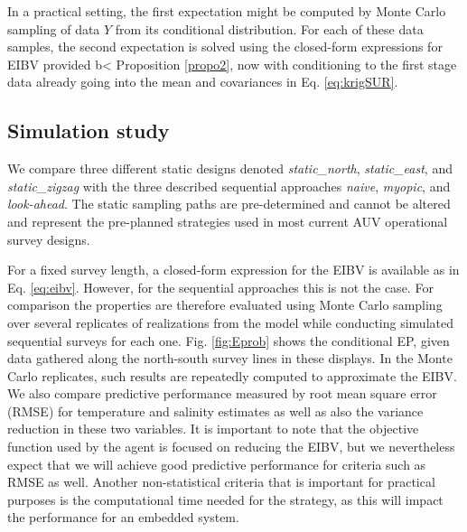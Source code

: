 \begin{remark}
In a practical setting, the first expectation might be computed by Monte
Carlo sampling of data $Y$ from its conditional
distribution. For each of these data samples, the second expectation
is solved using the closed-form expressions for EIBV provided b< Proposition \ref{propo2}, now with conditioning to the first stage data already going into the mean and covariances in Eq. \eqref{eq:krigSUR}. 
\end{remark}

\subsection{Simulation study}
\label{sec:simulations}

\label{sec:sampling_designs}


We compare three different static designs denoted
\textit{static\_north}, \textit{static\_east}, and
\textit{static\_zigzag} with the three described sequential approaches
\textit{naive}, \textit{myopic}, and \textit{look-ahead}. The static
sampling paths are pre-determined and cannot be altered and represent
the pre-planned strategies used in most current AUV operational survey
designs.

For a fixed survey length, a closed-form expression for the EIBV is
available as in Eq. \eqref{eq:eibv}. However, for the sequential
approaches this is not the case. For comparison the properties are
therefore evaluated using Monte Carlo sampling over several replicates
of realizations from the model while conducting simulated sequential
surveys for each one. Fig. \ref{fig:Eprob} shows the conditional EP,
given data gathered along the north-south survey lines in these
displays. In the Monte Carlo replicates, such results are repeatedly
computed to approximate the EIBV. We also compare predictive
performance measured by root mean square error (RMSE) for temperature
and salinity estimates as well as also the variance reduction in these
two variables. It is important to note that the objective function
used by the agent  is focused on reducing the
EIBV, but we nevertheless expect that we will achieve good predictive
performance for criteria such as RMSE as well. Another non-statistical
criteria that is important for practical purposes is the computational
time needed for the strategy, as this will impact the performance for
an embedded system.

